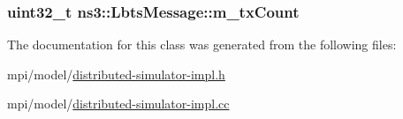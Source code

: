 \subsubsection[{\texorpdfstring{m\+\_\+tx\+Count}{m_txCount}}]{\setlength{\rightskip}{0pt plus 5cm}uint32\+\_\+t ns3\+::\+Lbts\+Message\+::m\+\_\+tx\+Count\hspace{0.3cm}{\ttfamily [private]}}\hypertarget{classns3_1_1LbtsMessage_a0197a17e4acd0dd83b652992f9e8b930}{}\label{classns3_1_1LbtsMessage_a0197a17e4acd0dd83b652992f9e8b930}


The documentation for this class was generated from the following files\+:\begin{DoxyCompactItemize}
\item 
mpi/model/\hyperlink{distributed-simulator-impl_8h}{distributed-\/simulator-\/impl.\+h}\item 
mpi/model/\hyperlink{distributed-simulator-impl_8cc}{distributed-\/simulator-\/impl.\+cc}\end{DoxyCompactItemize}
